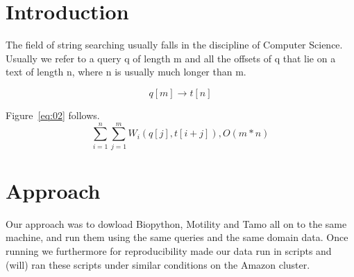 \documentclass{bioinfo}
\begin{document}
\section{Introduction}
The field of string searching usually falls in the discipline of 
Computer Science.  Usually we refer to a query q of length m and all the
offsets of q that lie on a text of length n, where n is usually 
much longer than m.

\begin{equation}
 q[m] \rightarrow t[n]\label{eq:01}
\end{equation}



Figure~\ref{eq:02} follows.
\begin{equation}
  \sum_{i=1}^{n} \sum_{j=1}^{m} W_i (q[j], t[i+j]),   O(m*n)\label{eq:02}
\end{equation}




\section{Approach}
Our approach was to dowload Biopython, Motility and Tamo all on to 
the same machine, and run them using the same queries and the same domain data.
Once running we furthermore for reproducibility made our data run in scripts
and (will) ran these scripts under similar conditions on the Amazon cluster.
\end{document}
